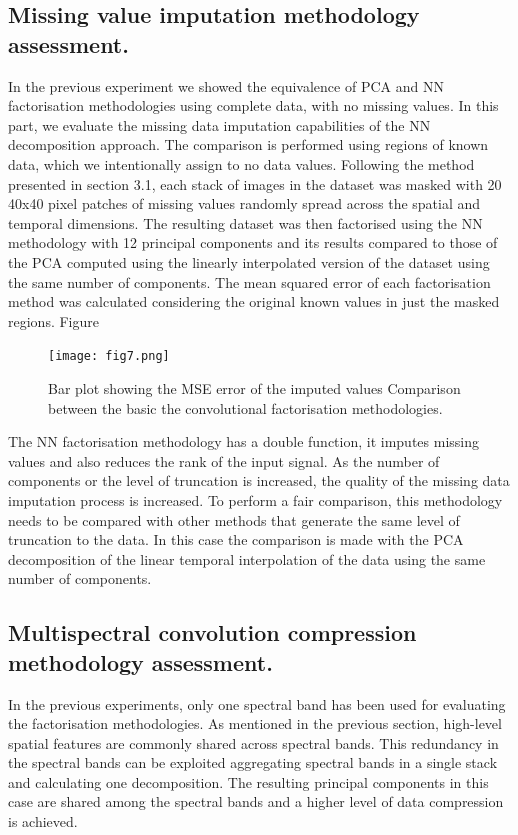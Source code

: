 \documentclass[essd, manuscript]{copernicus}
\begin{document}
\subsection{Missing value imputation methodology assessment.}
In the previous experiment we showed the equivalence of PCA and NN factorisation methodologies using complete data, with no missing values. In this part, we evaluate the missing data imputation capabilities of the NN decomposition approach. The comparison is performed using regions of known data, which we intentionally assign to no data values. Following the method presented in section 3.1, each stack of images in the dataset was masked with 20 40x40 pixel patches of missing values randomly spread across the spatial and temporal dimensions. The resulting dataset was then factorised using the NN methodology with 12 principal components and its results compared to those of the PCA computed using the linearly interpolated version of the dataset using the same number of components. The mean squared error of each factorisation method was calculated considering the original known values in just the masked regions. Figure 

\begin{figure}
    \texttt{[image: fig7.png]}
    \caption{Bar plot showing the MSE error of the imputed values Comparison between the basic the convolutional factorisation methodologies.}%
    \label{multispectral_cmp}%
\end{figure}

The NN factorisation methodology has a double function, it imputes missing values and also reduces the rank of the input signal. As the number of components or the level of truncation is increased, the quality of the missing data imputation process is increased. To perform a fair comparison, this methodology needs to be compared with other methods that generate the same level of truncation to the data. In this case the comparison is made with the PCA decomposition of the linear temporal interpolation of the data using the same number of components. 

\subsection{Multispectral convolution compression methodology assessment.}
In the previous experiments, only one spectral band has been used for evaluating the factorisation methodologies. As mentioned in the previous section, high-level spatial features are commonly shared across spectral bands. This redundancy in the spectral bands can be exploited aggregating spectral bands in a single stack and calculating one decomposition. The resulting principal components in this case are shared among the spectral bands and a higher level of data compression is achieved.
\end{document}

